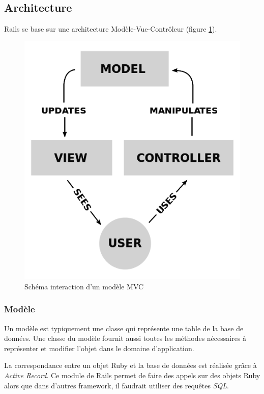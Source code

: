 \subsection{Architecture}
Rails se base sur une architecture Modèle-Vue-Contrôleur \cite{wiki-mvc} (figure \ref{fig:mvc}).
\begin{figure}[ht]
  \begin{center}
    \includegraphics[scale=0.3]{content/4-prerequis/images/mvc}
    \caption{Schéma interaction d'un modèle MVC}
    \label{fig:mvc}
  \end{center}
\end{figure}
\subsubsection{Modèle} 
Un modèle est typiquement une classe qui représente une table de la base de données. Une classe du modèle fournit aussi toutes les méthodes nécessaires à représenter et modifier l'objet dans le domaine d'application.

La correspondance entre un objet Ruby et la base de données est réalisée grâce à \textit{Active Record}. Ce module de Rails permet de faire des appels sur des objets Ruby alors que dans d'autres framework, il faudrait utiliser des requêtes \textit{SQL}. \label{active-record}
  
